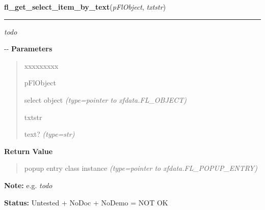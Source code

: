 \hspace{.8\funcindent}\begin{boxedminipage}{\funcwidth}

    \raggedright \textbf{fl\_get\_select\_item\_by\_text}(\textit{pFlObject}, \textit{txtstr})

    \vspace{-1.5ex}

    \rule{\textwidth}{0.5\fboxrule}
\setlength{\parskip}{2ex}

\emph{todo}

-{}-
\setlength{\parskip}{1ex}
      \textbf{Parameters}
      \vspace{-1ex}

      \begin{quote}
        \begin{Ventry}{xxxxxxxxx}

          \item[pFlObject]


select object
            {\it (type=pointer to xfdata.FL\_OBJECT)}

          \item[txtstr]


text?
            {\it (type=str)}

        \end{Ventry}

      \end{quote}

      \textbf{Return Value}
    \vspace{-1ex}

      \begin{quote}

popup entry class instance
      {\it (type=pointer to xfdata.FL\_POPUP\_ENTRY)}

      \end{quote}

\textbf{Note:} 
e.g. \emph{todo}


\textbf{Status:} 
Untested + NoDoc + NoDemo = NOT OK


    \end{boxedminipage}

    \label{xformslib:flselect:fl_get_select_text_color}

    \vspace{0.5ex}

